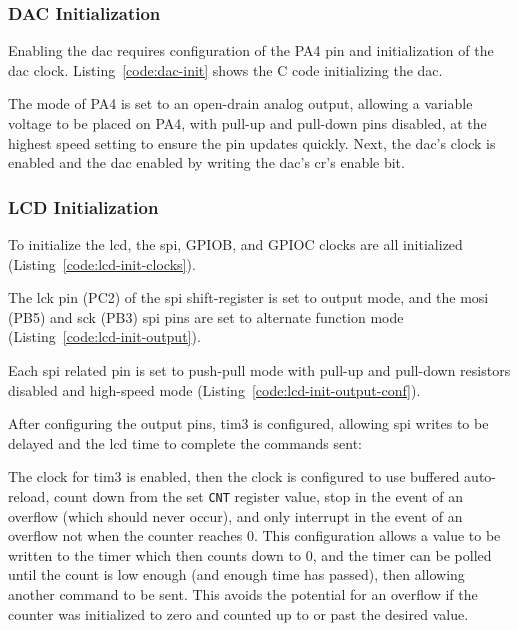 \subsubsection{DAC Initialization}
Enabling the \gls{dac} requires configuration of the PA4 pin and
initialization of the \gls{dac} clock. Listing~\ref{code:dac-init} shows
the C code initializing the \gls{dac}.


The mode of PA4 is set to an open-drain analog output, allowing a
variable voltage to be placed on PA4, with pull-up and pull-down
pins disabled, at the highest speed setting to ensure the pin updates
quickly. Next, the \gls{dac}'s clock is enabled and the \gls{dac}
enabled by writing the \gls{dac}'s \gls{cr}'s enable bit.

\subsubsection{LCD Initialization}

To initialize the \gls{lcd}, the \gls{spi}, GPIOB, and GPIOC clocks are
all initialized (Listing~\ref{code:lcd-init-clocks}).


The \gls{lck} pin (PC2) of the \gls{spi} shift-register is set to output
mode, and the \gls{mosi} (PB5) and \gls{sck} (PB3) \gls{spi} pins are
set to alternate function mode (Listing~\ref{code:lcd-init-output}).


Each \gls{spi} related pin is set to push-pull mode with pull-up and
pull-down resistors disabled and high-speed mode
(Listing~\ref{code:lcd-init-output-conf}).


After configuring the output pins, \gls{tim3} is configured, allowing
\gls{spi} writes to be delayed and the \gls{lcd} time to complete
the commands sent:


The clock for \gls{tim3} is enabled, then the clock is configured to use
buffered auto-reload, count down from the set \lstinline{CNT} register
value, stop in the event of an overflow (which should never occur), and
only interrupt in the event of an overflow not when the counter reaches
0. This configuration allows a value to be written to the timer which
then counts down to 0, and the timer can be polled until the count is
low enough (and enough time has passed), then allowing another command to be
sent. This avoids the potential for an overflow if the counter was
initialized to zero and counted up to or past the desired value. \\

